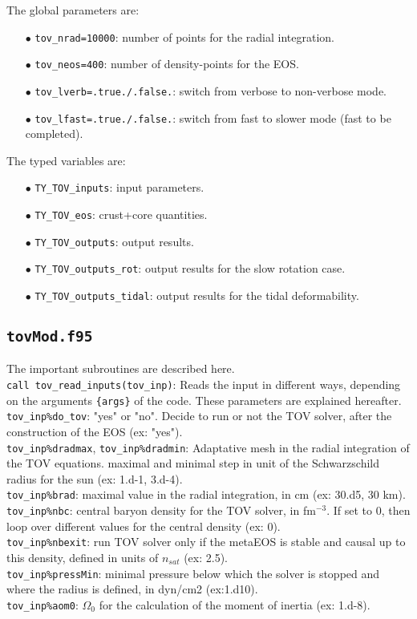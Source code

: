 \documentclass[11pt]{article}
\newcommand{\code}[1]{\colorbox{light-gray}{\mbox{\texttt{#1}}}}
\begin{document}
The global parameters are:
\begin{enumerate}
\item[$\bullet$] \code{tov\_nrad=10000}: number of points for the radial integration.
\item[$\bullet$] \code{tov\_neos=400}: number of density-points for the EOS.
\item[$\bullet$] \code{tov\_lverb=.true./.false.}: switch from verbose to non-verbose mode.
\item[$\bullet$] \code{tov\_lfast=.true./.false.}: switch from fast to slower mode (fast to be completed).
\end{enumerate}

The typed variables are:
\begin{enumerate}
\item[$\bullet$] \code{TY\_TOV\_inputs}: input parameters.
\item[$\bullet$] \code{TY\_TOV\_eos}: crust+core quantities.
\item[$\bullet$] \code{TY\_TOV\_outputs}: output results.
\item[$\bullet$] \code{TY\_TOV\_outputs\_rot}: output results for the slow rotation case.
\item[$\bullet$] \code{TY\_TOV\_outputs\_tidal}: output results for the tidal deformability.
\end{enumerate}



\subsection{\code{tovMod.f95}}

The important subroutines are described here.\\

\code{call tov\_read\_inputs(tov\_inp)}: Reads the input in different ways, depending on the arguments  \code{\{args\}} of the code. These parameters are explained hereafter.\\
\code{tov\_inp\%do\_tov}: "yes" or "no". Decide to run or not the TOV solver, after the construction of the EOS (ex: "yes").\\
\code{tov\_inp\%dradmax}, \code{tov\_inp\%dradmin}: Adaptative mesh in the radial integration of the TOV equations. maximal and minimal step in unit of the Schwarzschild radius for the sun (ex: 1.d-1, 3.d-4).\\
\code{tov\_inp\%brad}: maximal value in the radial integration, in cm (ex: 30.d5, 30 km).\\
\code{tov\_inp\%nbc}: central baryon density for the TOV solver, in fm$^{-3}$. If set to 0, then loop over different values for the central density (ex: 0).\\
\code{tov\_inp\%nbexit}: run TOV solver only if the metaEOS is stable and causal up to this density, defined in units of $n_{sat}$ (ex: 2.5).\\
\code{tov\_inp\%pressMin}: minimal pressure below which the solver is stopped and where the radius is defined, in dyn/cm2 (ex:1.d10).\\
\code{tov\_inp\%aom0}: $\Omega_0$ for the calculation of the moment of inertia (ex: 1.d-8).
\end{document}
